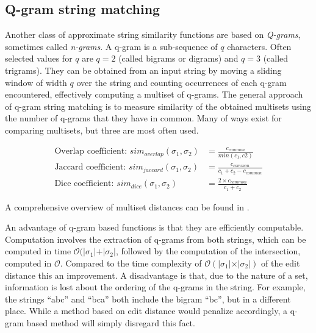 
\subsection{Q-gram string matching}
\label{subsec:qgram}

Another class of approximate string similarity functions are based on \emph{Q-grams}, sometimes called \emph{n-grams}.
A q-gram is a sub-sequence of $q$ characters.
Often selected values for $q$ are $q=2$ (called bigrams or digrams) and $q=3$ (called trigrams).
They can be obtained from an input string by moving a sliding window of width $q$ over the string and counting occurrences of each q-gram encountered, effectively computing a multiset of q-grams.
The general approach of q-gram string matching is to measure similarity of the obtained multisets using the number of q-grams that they have in common.
Many of ways exist for comparing multisets, but three are most often used.

\begin{align}
    \text{Overlap coefficient: }sim_{overlap}(\sigma_1, \sigma_2) &= \frac{c_{common}}{min(c_1, c2)} \\
    \text{Jaccard coefficient: }sim_{jaccard}(\sigma_1, \sigma_2) &= \frac{c_{common}}{c_1 + c_2 - c_{common}} \\
    \text{Dice coefficient: }sim_{dice}(\sigma_1, \sigma_2) &= \frac{2 \times c_{common}}{c_1 + c_2}
\end{align}

\noindent A comprehensive overview of multiset distances can be found in \citep{Kosters2008}.

An advantage of q-gram based functions is that they are efficiently computable.
Computation involves the extraction of q-grams from both strings, which can be computed in time $\mathcal{O}(\vert \sigma_1 \vert + \vert \sigma_2 \vert$, followed by the computation of the intersection, computed in $\mathcal{O}$.
Compared to the time complexity of $\mathcal{O}(\vert \sigma_1 \vert \times \vert \sigma_2 \vert)$ of the edit distance this an improvement.
A disadvantage is that, due to the nature of a set, information is lost about the ordering of the q-grams in the string.
For example, the strings ``abc'' and ``bca'' both include the bigram ``bc'', but in a different place.
While a method based on edit distance would penalize accordingly, a q-gram based method will simply disregard this fact.




